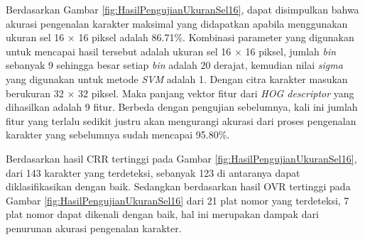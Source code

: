 \begin{adjustbox}{width=1\textwidth}
	\noindent\begin{minipage}{\linewidth}
		\centering{}
		\label{fig:HasilPengujianUkuranSel16}
	\end{minipage}
\end{adjustbox}

\noindent Berdasarkan Gambar \ref{fig:HasilPengujianUkuranSel16}, dapat disimpulkan bahwa akurasi pengenalan karakter maksimal yang didapatkan apabila menggunakan ukuran sel 16 $\times$ 16 piksel adalah 86.71\%. Kombinasi parameter yang digunakan untuk mencapai hasil tersebut adalah ukuran sel 16 $\times$ 16 piksel, jumlah \textit{bin} sebanyak 9 sehingga besar setiap \textit{bin} adalah 20 derajat, kemudian nilai \textit{sigma} yang digunakan untuk metode \textit{SVM} adalah 1. Dengan citra karakter masukan berukuran 32 $\times$ 32 piksel. Maka panjang vektor fitur dari \textit{HOG descriptor} yang dihasilkan adalah 9 fitur. Berbeda dengan pengujian sebelumnya, kali ini jumlah fitur yang terlalu sedikit justru akan mengurangi akurasi dari proses pengenalan karakter yang sebelumnya sudah mencapai 95.80\%. 

\noindent Berdasarkan hasil CRR tertinggi pada Gambar \ref{fig:HasilPengujianUkuranSel16}, dari 143 karakter yang terdeteksi, sebanyak 123 di antaranya dapat diklasifikasikan dengan baik. Sedangkan berdasarkan hasil OVR tertinggi pada Gambar \ref{fig:HasilPengujianUkuranSel16} dari 21 plat nomor yang terdeteksi, 7 plat nomor dapat dikenali dengan baik, hal ini merupakan dampak dari penurunan akurasi pengenalan karakter.

